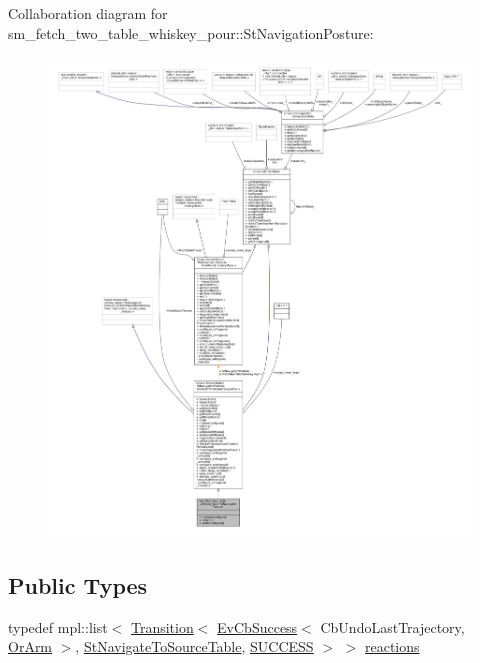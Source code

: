 Collaboration diagram for sm\+\_\+fetch\+\_\+two\+\_\+table\+\_\+whiskey\+\_\+pour\+:\+:St\+Navigation\+Posture\+:
\nopagebreak
\begin{figure}[H]
\begin{center}
\leavevmode
\includegraphics[width=350pt]{structsm__fetch__two__table__whiskey__pour_1_1StNavigationPosture__coll__graph}
\end{center}
\end{figure}
\subsection*{Public Types}
\begin{DoxyCompactItemize}
\item 
typedef mpl\+::list$<$ \hyperlink{classsmacc_1_1Transition}{Transition}$<$ \hyperlink{structsmacc_1_1EvCbSuccess}{Ev\+Cb\+Success}$<$ Cb\+Undo\+Last\+Trajectory, \hyperlink{classsm__fetch__two__table__whiskey__pour_1_1OrArm}{Or\+Arm} $>$, \hyperlink{structsm__fetch__two__table__whiskey__pour_1_1StNavigateToSourceTable}{St\+Navigate\+To\+Source\+Table}, \hyperlink{structsmacc_1_1default__transition__tags_1_1SUCCESS}{S\+U\+C\+C\+E\+SS} $>$ $>$ \hyperlink{structsm__fetch__two__table__whiskey__pour_1_1StNavigationPosture_a02701594898d69b5e0feafab57af0593}{reactions}
\end{DoxyCompactItemize}
